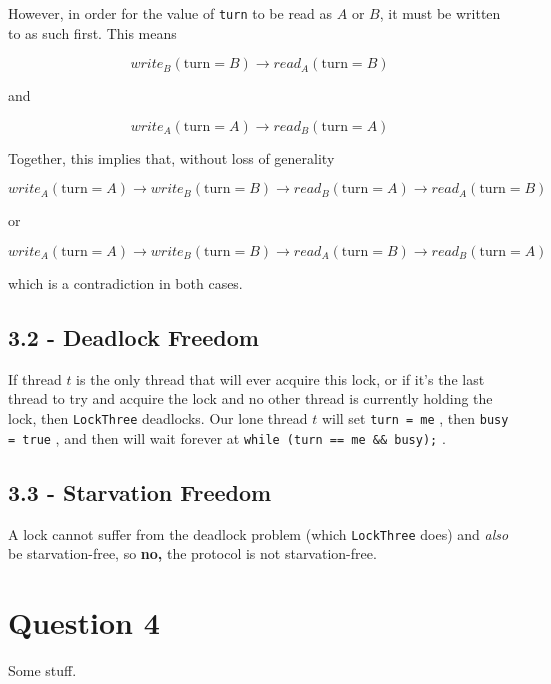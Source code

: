 \documentclass[11pt, letterpaper]{article}
\newcommand{\code}[1] { \texttt{#1} }
\begin{document}
However, in order for the value of \code{turn} to be read as $A$ or $B$, it must be written to as such first. This means

$$
write_B(\text{turn} = B) \rightarrow read_A(\text{turn} = B)
$$

and

$$
write_A(\text{turn} = A) \rightarrow read_B(\text{turn} = A)
$$

Together, this implies that, without loss of generality

$$
write_A(\text{turn} = A) \rightarrow write_B(\text{turn} = B) \rightarrow
read_B(\text{turn} = A) \rightarrow read_A(\text{turn} = B)
$$

or

$$
write_A(\text{turn} = A) \rightarrow write_B(\text{turn} = B) \rightarrow
read_A(\text{turn} = B) \rightarrow read_B(\text{turn} = A)
$$

which is a contradiction in both cases.

\subsection*{3.2 - Deadlock Freedom}
\label{sub:3_2_deadlock_freedom}

If thread $t$ is the only thread that will ever acquire this lock, or if it's the last thread to try and acquire the lock and no other thread is currently holding the lock, then \code{LockThree} deadlocks. Our lone thread $t$ will set \code{turn = me}, then \code{busy = true}, and then will wait forever at \code{while (turn == me && busy);}.

\subsection*{3.3 - Starvation Freedom}
\label{sub:3_3_starvation_freedom}

A lock cannot suffer from the deadlock problem (which \code{LockThree} does) and \textit{also} be starvation-free, so \textbf{no,} the protocol is not starvation-free.

\newpage
\section*{Question 4}
\label{sec:question_4}

Some stuff.
\end{document}
